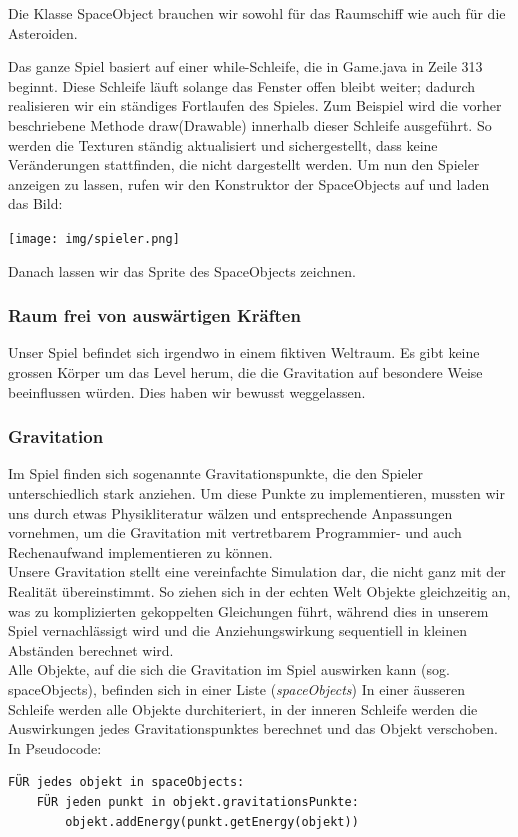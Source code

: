 \documentclass[12pt,a4paper]{scrartcl}
\begin{document}
Die Klasse SpaceObject brauchen wir sowohl für das Raumschiff wie auch für die Asteroiden.


Das ganze Spiel basiert auf einer while-Schleife, die in Game.java in Zeile 313 beginnt.
Diese Schleife läuft solange das Fenster offen bleibt weiter; dadurch realisieren wir ein ständiges Fortlaufen des Spieles.
Zum Beispiel wird die vorher beschriebene Methode draw(Drawable) innerhalb dieser Schleife ausgeführt.
So werden die Texturen ständig aktualisiert und sichergestellt, dass keine Veränderungen stattfinden, die nicht dargestellt werden.
Um nun den Spieler anzeigen zu lassen, rufen wir den Konstruktor der SpaceObjects auf und laden das Bild: 	\\

\begin{center}
\texttt{[image: img/spieler.png]}
\end{center}

Danach lassen wir das Sprite des SpaceObjects zeichnen.




\subsubsection{Raum frei von auswärtigen Kräften}
Unser Spiel befindet sich irgendwo in einem fiktiven Weltraum. Es gibt keine grossen Körper um das
Level herum, die die Gravitation auf besondere Weise beeinflussen würden. Dies haben wir bewusst weggelassen.


\subsubsection{Gravitation}
Im Spiel finden sich sogenannte Gravitationspunkte, die den Spieler unterschiedlich stark anziehen.
Um diese Punkte zu implementieren, mussten wir uns durch etwas Physikliteratur wälzen und entsprechende
Anpassungen vornehmen, um die Gravitation mit vertretbarem Programmier- und auch Rechenaufwand implementieren zu können.  \\

Unsere Gravitation stellt eine vereinfachte Simulation dar, die nicht ganz mit der Realität übereinstimmt.
So ziehen sich in der echten Welt Objekte gleichzeitig an, was zu komplizierten gekoppelten Gleichungen führt, während dies in
unserem Spiel vernachlässigt wird und die Anziehungswirkung sequentiell in kleinen Abständen berechnet wird.\\

Alle Objekte, auf die sich die Gravitation im Spiel auswirken kann (sog. spaceObjects), befinden sich in einer Liste (\textit{spaceObjects})
In einer äusseren Schleife werden alle Objekte durchiteriert, in der inneren Schleife werden die Auswirkungen jedes Gravitationspunktes berechnet und
das Objekt verschoben. In Pseudocode:
\begin{verbatim}
FÜR jedes objekt in spaceObjects:
    FÜR jeden punkt in objekt.gravitationsPunkte:
        objekt.addEnergy(punkt.getEnergy(objekt))
\end{verbatim}
\end{document}
